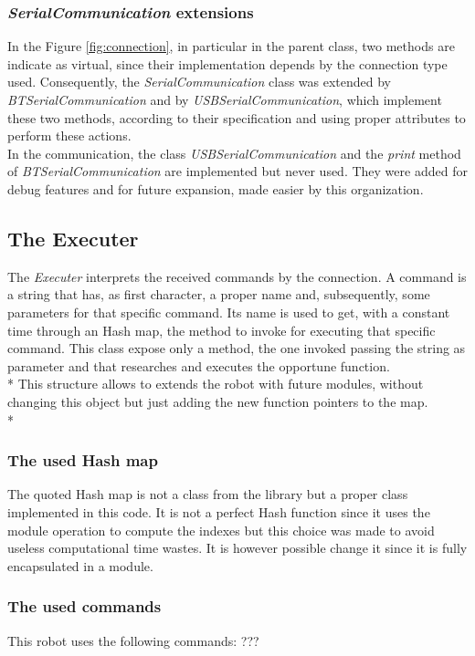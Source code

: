 \subsubsection{\textit{SerialCommunication} extensions}
In the Figure \ref{fig:connection}, in particular in the parent class, two methods are indicate as virtual, since their implementation depends by the connection type used. Consequently, the \textit{SerialCommunication} class was extended by \textit{BTSerialCommunication} and by \textit{USBSerialCommunication}, which implement these two methods, according to their specification and using proper attributes to perform these actions.\\
In the communication, the class \textit{USBSerialCommunication} and the \textit{print} method of \textit{BTSerialCommunication} are implemented but never used. They were added for debug features and for future expansion, made easier by this organization.

\subsection{The Executer}
The \textit{Executer} interprets the received commands by the connection. A command is a string that has, as first character, a proper name and, subsequently, some parameters for that specific command. Its name is used to get, with a constant time through an Hash map, the method to invoke for executing that specific command. This class expose only a method, the one invoked passing the string as parameter and that researches and executes the opportune function.\\*
This structure allows to extends the robot with future modules, without changing this object but just adding the new function pointers to the map.\\*

\subsubsection{The used Hash map}
The quoted Hash map is not a class from the library but a proper class implemented in this code. It is not a perfect Hash function since it uses the module operation to compute the indexes but this choice was made to avoid useless computational time wastes. It is however possible change it since it is fully encapsulated in a module.\\

\subsubsection{The used commands}
This robot uses the following commands:
???

